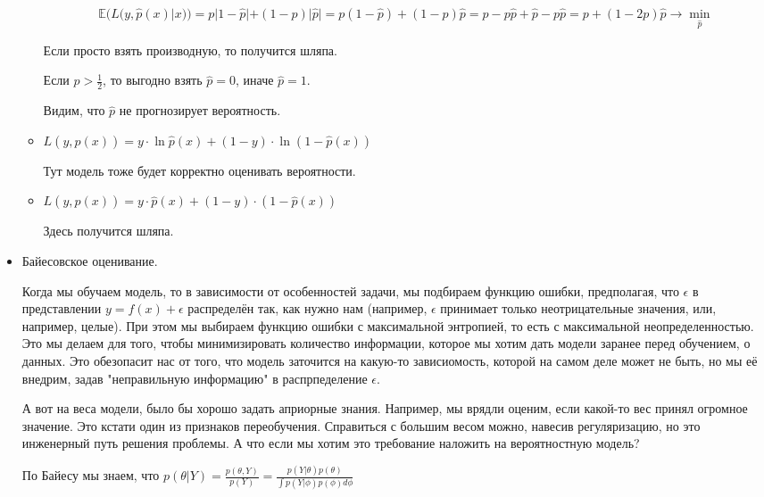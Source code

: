 \documentclass[12pt]{article}
\begin{document}
\begin{itemize}
\begin{itemize}
        \[ \mathbb{E}(L(y, \hat{p}(x) | x)) = p |1-\hat{p}| + (1-p)|\hat{p}| = p(1-\hat{p}) + (1-p)\hat{p} = p-p\hat{p} + \hat{p} - p\hat{p} = p + (1-2p)\hat{p} \rightarrow \min_{\hat{p}}\]

        Если просто взять производную, то получится шляпа.


        Если $p > \frac{1}{2}$, то выгодно взять $\hat{p} = 0$, иначе $\hat{p} = 1$.

        Видим, что $\hat{p}$ не прогнозирует вероятность.

        \item $L(y, \hat{p}(x)) = y \cdot \ln \hat{p}(x) + (1-y) \cdot \ln (1-\hat{p}(x))$
    
        Тут модель тоже будет корректно оценивать вероятности.
    
        \item $L(y, \hat{p}(x)) = y \cdot \hat{p}(x) + (1-y) \cdot (1-\hat{p}(x))$
        
        Здесь получится шляпа.

    \end{itemize}

    \item Байесовское оценивание.
    
    Когда мы обучаем модель, то в зависимости от особенностей задачи, мы подбираем функцию ошибки, предполагая, что $\epsilon$ в представлении $y = f(x) + \epsilon$ распределён так, как нужно нам (например, $\epsilon$ принимает только неотрицательные значения, или, например, целые). При этом мы выбираем функцию ошибки с максимальной энтропией, то есть с максимальной неопределенностью. Это мы делаем для того, чтобы минимизировать количество информации, которое мы хотим дать модели заранее перед обучением, о данных. Это обезопасит нас от того, что модель заточится на какую-то зависиомость, которой на самом деле может не быть, но мы её внедрим, задав "неправильную информацию" в распрпеделение $\epsilon$.

    А вот на веса модели, было бы хорошо задать априорные знания. Например, мы врядли оценим, если какой-то вес принял огромное значение. Это кстати один из признаков переобучения. Справиться с большим весом можно, навесив регуляризацию, но это инженерный путь решения проблемы. А что если мы хотим это требование наложить на вероятностную модель?

    По Байесу мы знаем, что $p(\theta | Y) = \frac{p(\theta, Y)}{p(Y)} = \frac{p(Y|\theta)p(\theta)}{\int p(Y|\phi)p(\phi) d \phi}$


\end{itemize}
\end{document}

